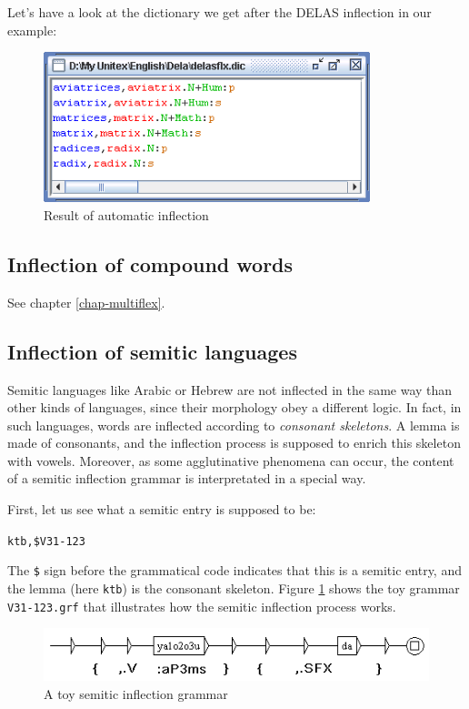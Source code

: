 \bigskip
\noindent Let's have a look at the dictionary we get after the DELAS inflection in
our example:

\bigskip
\begin{figure}[h]
\begin{center}
\includegraphics[width=9.5cm]{resources/img/fig3-7.png}
\caption{Result of automatic inflection}
\end{center}
\end{figure}

\subsection{Inflection of compound words}
See chapter \ref{chap-multiflex}.

\subsection{Inflection of semitic languages}
Semitic languages like Arabic or Hebrew are not inflected in the same way than 
other kinds of languages, since their morphology obey a different logic. In
fact, in such languages, words are inflected according to \textit{consonant
skeletons}. A lemma is made of consonants, and the
inflection process is supposed to enrich this skeleton with vowels. Moreover, as
some agglutinative phenomena can occur, the content of a semitic inflection
grammar is interpretated in a special way.

\bigskip
\noindent First, let us see what a semitic entry is supposed to be:

\bigskip
\noindent \verb+ktb,$V31-123+

\bigskip
\noindent The \verb+$+ sign before the grammatical code indicates that
this is a semitic entry, and the lemma (here \verb+ktb+) is the consonant
skeleton. Figure \ref{semitic-grammar} shows the toy grammar \verb+V31-123.grf+
that illustrates how the semitic inflection process works.  

\bigskip
\begin{figure}[!ht]
\begin{center}
\includegraphics[width=11.5cm]{resources/img/fig3-7a.png}
\caption{A toy semitic inflection grammar\label{semitic-grammar}}
\end{center}
\end{figure}

